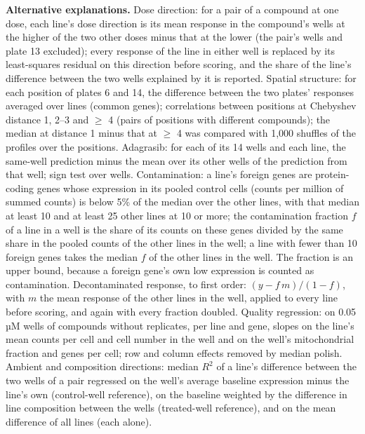 \documentclass[pdflatex,sn-nature]{sn-jnl}
\begin{document}
\textbf{Alternative explanations.} Dose direction: for a pair of a compound at one dose, each line's dose direction is its mean response in the compound's wells at the higher of the two other doses minus that at the lower (the pair's wells and plate 13 excluded); every response of the line in either well is replaced by its least-squares residual on this direction before scoring, and the share of the line's difference between the two wells explained by it is reported. Spatial structure: for each position of plates 6 and 14, the difference between the two plates' responses averaged over lines (common genes); correlations between positions at Chebyshev distance 1, 2--3 and $\geq$ 4 (pairs of positions with different compounds); the median at distance 1 minus that at $\geq$ 4 was compared with 1,000 shuffles of the profiles over the positions. Adagrasib: for each of its 14 wells and each line, the same-well prediction minus the mean over its other wells of the prediction from that well; sign test over wells. Contamination: a line's foreign genes are protein-coding genes whose expression in its pooled control cells (counts per million of summed counts) is below 5\% of the median over the other lines, with that median at least 10 and at least 25 other lines at 10 or more; the contamination fraction $f$ of a line in a well is the share of its counts on these genes divided by the same share in the pooled counts of the other lines in the well; a line with fewer than 10 foreign genes takes the median $f$ of the other lines in the well. The fraction is an upper bound, because a foreign gene's own low expression is counted as contamination. Decontaminated response, to first order: $(y-f\,m)/(1-f)$, with $m$ the mean response of the other lines in the well, applied to every line before scoring, and again with every fraction doubled. Quality regression: on 0.05\,µM wells of compounds without replicates, per line and gene, slopes on the line's mean counts per cell and cell number in the well and on the well's mitochondrial fraction and genes per cell; row and column effects removed by median polish. Ambient and composition directions: median $R^2$ of a line's difference between the two wells of a pair regressed on the well's average baseline expression minus the line's own (control-well reference), on the baseline weighted by the difference in line composition between the wells (treated-well reference), and on the mean difference of all lines (each alone).
\end{document}
